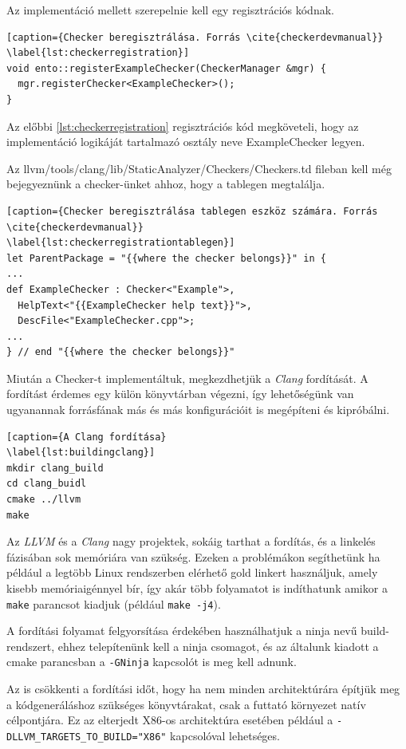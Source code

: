 \documentclass[a4paper,12pt]{report}
\begin{document}
Az implementáció mellett szerepelnie kell egy regisztrációs kódnak.

\begin{lstlisting}[caption={Checker beregisztrálása. Forrás \cite{checkerdevmanual}}
\label{lst:checkerregistration}]
void ento::registerExampleChecker(CheckerManager &mgr) {
  mgr.registerChecker<ExampleChecker>();
}
\end{lstlisting}

Az előbbi \ref{lst:checkerregistration} regisztrációs kód megköveteli, hogy az implementáció logikáját tartalmazó osztály neve ExampleChecker legyen.

Az llvm/tools/clang/lib/StaticAnalyzer/Checkers/Checkers.td fileban kell még bejegyeznünk a checker-ünket ahhoz, hogy a tablegen megtalálja.

\begin{lstlisting}[caption={Checker beregisztrálása tablegen eszköz számára. Forrás \cite{checkerdevmanual}}
\label{lst:checkerregistrationtablegen}]
let ParentPackage = "{{where the checker belongs}}" in {
...
def ExampleChecker : Checker<"Example">,
  HelpText<"{{ExampleChecker help text}}">,
  DescFile<"ExampleChecker.cpp">;
...
} // end "{{where the checker belongs}}"
\end{lstlisting}

Miután a Checker-t implementáltuk, megkezdhetjük a \emph{Clang} fordítását. A fordítást érdemes egy külön könyvtárban végezni, így lehetőségünk van ugyanannak forrásfának más és más konfigurációit is megépíteni és kipróbálni.

\begin{lstlisting}[caption={A Clang fordítása}
\label{lst:buildingclang}]
mkdir clang_build
cd clang_buidl
cmake ../llvm
make
\end{lstlisting}

Az \emph{LLVM} és a \emph{Clang} nagy projektek, sokáig tarthat a fordítás, és a linkelés fázisában sok memóriára van szükség. Ezeken a problémákon segíthetünk ha például a legtöbb Linux rendszerben elérhető gold linkert használjuk, amely kisebb memóriaigénnyel bír, így akár több folyamatot is indíthatunk amikor a \texttt{make} parancsot kiadjuk (például \texttt{make -j4}).

A fordítási folyamat felgyorsítása érdekében használhatjuk a ninja nevű build-rendszert, ehhez telepítenünk kell a ninja csomagot, és az általunk kiadott a cmake parancsban a \texttt{-GNinja} kapcsolót is meg kell adnunk.

Az is csökkenti a fordítási időt, hogy ha nem minden architektúrára építjük meg a kódgeneráláshoz szükséges könyvtárakat, csak a futtató környezet natív célpontjára. Ez az elterjedt X86-os architektúra esetében például a \texttt{-DLLVM\_TARGETS\_TO\_BUILD="X86"} kapcsolóval lehetséges.
\end{document}
